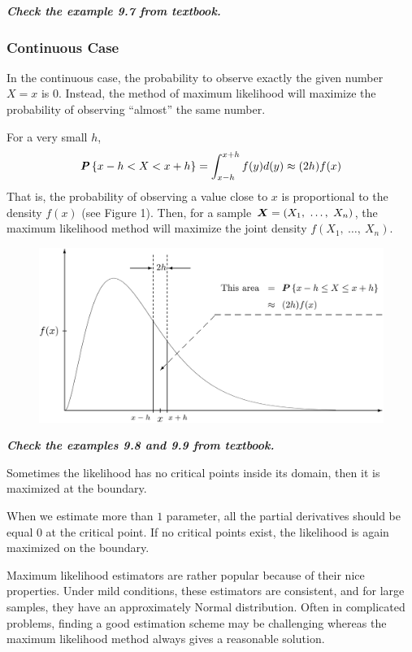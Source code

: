 \textbf{\textit{Check the example 9.7 from textbook.}}

\subsubsection{Continuous Case}
\label{subsubsec:cont-case}

In the continuous case, the probability to observe exactly the given number $X = x$ is $0$. Instead, the method of maximum likelihood will maximize the
probability of observing ``almost'' the same number.

For a very small $h$,
\begin{equation*}
  \textbf{\textit{P}}\left\{x - h < X < x + h\right\} = \int_{x - h}^{x + h} f(y) d(y) \approx (2h) f(x)
\end{equation*}
That is, the probability of observing a value close to $x$ is proportional to the density $f(x)$ (see Figure 1). Then, for a sample $\boldsymbol{X} = (X_1,\ \ldots,\ X_n)$, the maximum likelihood method will maximize the joint density $f(X_1,\ \ldots,\ X_n)$.
\begin{figure}[H]
  \centering
  \includegraphics[width=\linewidth]{img/fig-9.1.png}
  \caption{}
  \label{fig:9.1}
\end{figure}

\textbf{\textit{Check the examples 9.8 and 9.9 from textbook.}}

Sometimes the likelihood has no critical points inside its domain, then it is maximized at the boundary.

When we estimate more than $1$ parameter, all the partial derivatives should be equal $0$ at the critical point. If no critical points exist, the likelihood is again maximized on the boundary.

Maximum likelihood estimators are rather popular because of their nice properties. Under mild conditions, these estimators are consistent, and for large samples, they have an approximately Normal distribution. Often in complicated problems, finding a good estimation scheme may be challenging whereas the maximum likelihood method always gives a reasonable solution.

\vspace*{\fill}
\columnbreak
